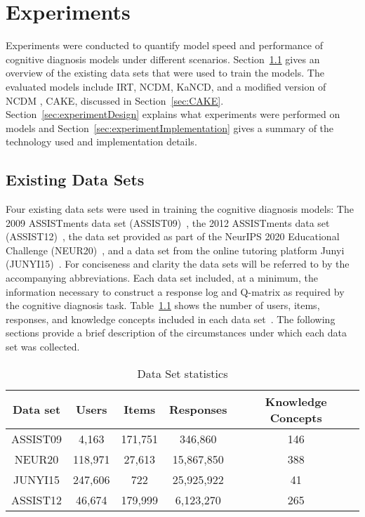 \documentclass[letterpaper, 12pt, captions=tableabove]{scrreprt}
\begin{document}
\chapter{Experiments}
\label{ch:experiments}
	Experiments were conducted to quantify model speed and performance of cognitive diagnosis models under different scenarios. Section~\ref{sec:existingDataSets} gives an overview of the existing data sets that were used to train the models. The evaluated models include IRT, NCDM, KaNCD, and a modified version of NCDM , CAKE, discussed in Section~\ref{sec:CAKE}.  Section~\ref{sec:experimentDesign} explains what experiments were performed on models and Section~\ref{sec:experimentImplementation} gives a summary of the technology used and implementation details.

	\section{Existing Data Sets}
	\label{sec:existingDataSets}
		Four existing data sets were used in training the cognitive diagnosis models: The 2009 ASSISTments data set (ASSIST09)~\cite{assist09}, the 2012 ASSISTments data set (ASSIST12)~\cite{feng2009}, the data set provided as part of the NeurIPS 2020 Educational Challenge (NEUR20)~\cite{wang2020b}, and a data set from the online tutoring platform Junyi (JUNYI15)~\cite{chang2015}. For conciseness and clarity the data sets will be referred to by the accompanying abbreviations. Each data set included, at a minimum, the information necessary to construct a response log and Q-matrix as required by the cognitive diagnosis task.  Table~\ref{tab:dataSetStats} shows the number of users, items, responses, and knowledge concepts included in each data set~\cite{wang2024}. The following sections provide a brief description of the circumstances under which each data set was collected.

		\begin{table}[htbp]
			\centering
			\begin{tabular}{c|cccc}
				Data set&Users&Items&Responses&Knowledge Concepts\\ \hline
				ASSIST09&4,163&171,751&346,860&146\\ \hline
				NEUR20&118,971&27,613&15,867,850&388\\ \hline
				JUNYI15&247,606&722&25,925,922&41\\ \hline
				ASSIST12&46,674&179,999&6,123,270&265\\ 
			\end{tabular}
			\caption{Data Set statistics}
			\label{tab:dataSetStats}
		\end{table}
\end{document}
